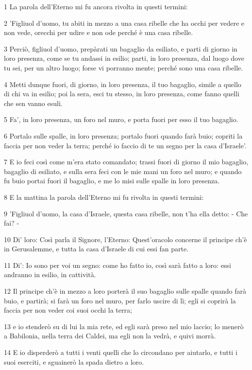 \par 1 La parola dell'Eterno mi fu ancora rivolta in questi termini:
\par 2 'Figliuol d'uomo, tu abiti in mezzo a una casa ribelle che ha occhi per vedere e non vede, orecchi per udire e non ode perché è una casa ribelle.
\par 3 Perciò, figliuol d'uomo, prepàrati un bagaglio da esiliato, e parti di giorno in loro presenza, come se tu andassi in esilio; parti, in loro presenza, dal luogo dove tu sei, per un altro luogo; forse vi porranno mente; perché sono una casa ribelle.
\par 4 Metti dunque fuori, di giorno, in loro presenza, il tuo bagaglio, simile a quello di chi va in esilio; poi la sera, esci tu stesso, in loro presenza, come fanno quelli che sen vanno esuli.
\par 5 Fa', in loro presenza, un foro nel muro, e porta fuori per esso il tuo bagaglio.
\par 6 Portalo sulle spalle, in loro presenza; portalo fuori quando farà buio; copriti la faccia per non veder la terra; perché io faccio di te un segno per la casa d'Israele'.
\par 7 E io feci così come m'era stato comandato; trassi fuori di giorno il mio bagaglio, bagaglio di esiliato, e sulla sera feci con le mie mani un foro nel muro; e quando fu buio portai fuori il bagaglio, e me lo misi sulle spalle in loro presenza.
\par 8 E la mattina la parola dell'Eterno mi fu rivolta in questi termini:
\par 9 'Figliuol d'uomo, la casa d'Israele, questa casa ribelle, non t'ha ella detto: - Che fai? -
\par 10 Di' loro: Così parla il Signore, l'Eterno: Quest'oracolo concerne il principe ch'è in Gerusalemme, e tutta la casa d'Israele di cui essi fan parte.
\par 11 Di': Io sono per voi un segno: come ho fatto io, così sarà fatto a loro: essi andranno in esilio, in cattività.
\par 12 Il principe ch'è in mezzo a loro porterà il suo bagaglio sulle spalle quando farà buio, e partirà; si farà un foro nel muro, per farlo uscire di lì; egli si coprirà la faccia per non veder coi suoi occhi la terra;
\par 13 e io stenderò su di lui la mia rete, ed egli sarà preso nel mio laccio; lo menerò a Babilonia, nella terra dei Caldei, ma egli non la vedrà, e quivi morrà.
\par 14 E io disperderò a tutti i venti quelli che lo circondano per aiutarlo, e tutti i suoi eserciti, e sguainerò la spada dietro a loro.
